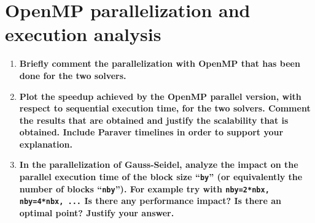 \documentclass[a4paper,11pt]{article}
\begin{document}
\section{OpenMP parallelization and execution analysis}
\begin{enumerate}
\setcounter{enumi}{0}
\item
\textbf{Briefly comment the parallelization with OpenMP that has been done for the two solvers.}
\setcounter{enumi}{1}
\item
\textbf{Plot the speedup achieved by the OpenMP parallel version, with respect to sequential execution
    time, for the two solvers. Comment the results that are obtained and justify the scalability that is
    obtained. Include Paraver timelines in order to support your explanation.}
\setcounter{enumi}{2}
\item
\textbf{In the parallelization of Gauss-Seidel, analyze the impact on the parallel execution time of the
    block size ``\texttt{by}'' (or equivalently the number of blocks ``\texttt{nby}''). For example try with
    \texttt{nby=2*nbx, nby=4*nbx, ...} Is there any performance impact? Is there an optimal point?
    Justify your answer.}
\end{enumerate}
\end{document}
